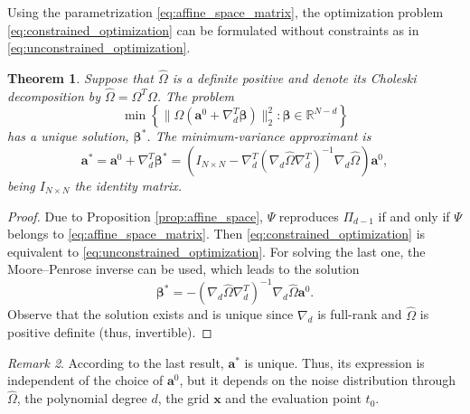\documentclass[preprint]{elsarticle}       %
\newcommand{\R}{\mathds{R}}
\newcommand{\ba}{\bm{a}}
\newcommand{\bx}{\bm{x}}
\newcommand{\bbeta}{\bm{\beta}}
\newcommand{\dif}{\nabla_d}
\theoremstyle{plain}
\newtheorem{thm}{Theorem}
\theoremstyle{remark}
\newtheorem{rmk}[thm]{Remark}
\begin{document}
Using the parametrization \eqref{eq:affine_space_matrix}, the optimization problem \eqref{eq:constrained_optimization} can be formulated without constraints as in \eqref{eq:unconstrained_optimization}.
\begin{thm} \label{thm:existance_of_the_best}
    Suppose that $\hat \Omega$ is a definite positive and denote its Choleski decomposition by $\hat \Omega = \Omega^T \Omega$.
	The problem
	\begin{equation} \label{eq:unconstrained_optimization}
		\min \left \{ \|\Omega(\ba^0 + \dif^T \bbeta) \|_2^2 : \bbeta\in\R^{N-d} \right \}
	\end{equation}
	has a unique solution, $\bbeta^*$.
	The minimum-variance approximant is
$$ \ba^* = \ba^0 + \dif^T \bbeta^* = (I_{N\times N} - \dif^T (\dif \hat \Omega \dif^T)^{-1} \dif \hat \Omega ) \ba^0,$$
	being $I_{N\times N}$ the identity matrix.
\end{thm}
\begin{proof}
	Due to Proposition \ref{prop:affine_space}, $\Psi$ reproduces $\Pi_{d-1}$ if and only if $\Psi$ belongs to \eqref{eq:affine_space_matrix}. Then \eqref{eq:constrained_optimization} is equivalent to \eqref{eq:unconstrained_optimization}. For solving the last one, the Moore–Penrose inverse can be used, which leads to the solution
$$ \bbeta^* = - (\dif \hat \Omega \dif^T)^{-1} \dif \hat \Omega \ba^0.$$
	Observe that the solution exists and is unique since $\dif$ is full-rank and $\hat \Omega$ is positive definite (thus, invertible).
\end{proof}


\begin{rmk}
	According to the last result, $\ba^*$ is unique. Thus, its expression is independent of the choice of $\ba^0$, but it depends on the noise distribution through $\hat \Omega$, the polynomial degree $d$, the grid $\bx$ and the evaluation point $t_0$.
\end{rmk}
\end{document}

